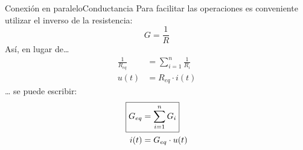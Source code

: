 \documentclass[aspectratio=169, xcolor={usenames,svgnames,dvipsnames}]{beamer}
\begin{document}
\begin{frame}{Conexión en paralelo}{Conductancia}
Para facilitar las operaciones es conveniente utilizar el inverso de la resistencia:
\begin{equation*}
  G = \frac{1}{R}
\end{equation*}
Así, en lugar de\ldots{}
\begin{align*}
  \frac{1}{R_{eq}} &= \sum_{i = 1}^n \frac{1}{R_i}\\
  u(t) &= R_{eq} \cdot i(t)
\end{align*}
\ldots{} se puede escribir:
\begin{align*}
  \Aboxed{G_{eq} &= \sum_{i = 1}^n G_i}\\
  i(t) &= G_{eq} \cdot u(t)
\end{align*}
\end{frame}
\end{document}
